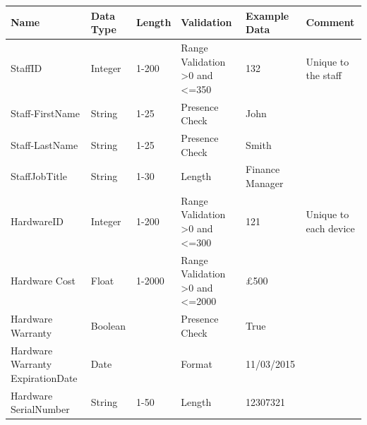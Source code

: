 \begin{center}
\begin{longtable}{|p{2cm}|p{1.14cm}|p{1.1cm}|p{1.7cm}|p{1.7cm}|p{2cm}|}
\hline
\textbf{Name} & \textbf{Data Type}& \textbf{Length} & \textbf{Validation} & \textbf{Example Data} & \textbf{Comment}      \\ \hline
StaffID                             & Integer                                 & 1-200                     & Range Validation \textgreater0 and \textless=350                                 & 132                   & Unique to the staff   \\ \hline
Staff-FirstName                      & String                                  & 1-25                                 & Presence Check                           & John                  &                       \\ \hline
Staff-LastName                       & String                                  & 1-25                                 & Presence Check                           & Smith                 &                       \\ \hline
StaffJobTitle			& String				& 1-30			& Length			& Finance Manager		&		\\ \hline
HardwareID                          & Integer                                 & 1-200                                & Range Validation \textgreater0 and  \textless=300                      & 121                   & Unique to each device \\ \hline
Hardware Cost                       & Float                                 & 1-2000                             & Range Validation \textgreater0 and \textless=2000                                    & £500                  &                       \\ \hline
Hardware Warranty                    & Boolean                                 &                                      & Presence Check                           & True                  &                       \\ \hline
Hardware Warranty ExpirationDate              & Date                                  &                                & Format                                   & 11/03/2015               &                       \\ \hline
Hardware SerialNumber                & String                                  & 1-50                                 & Length                                   & 12307321              &                       \\ \hline

\end{longtable}
\end{center}
